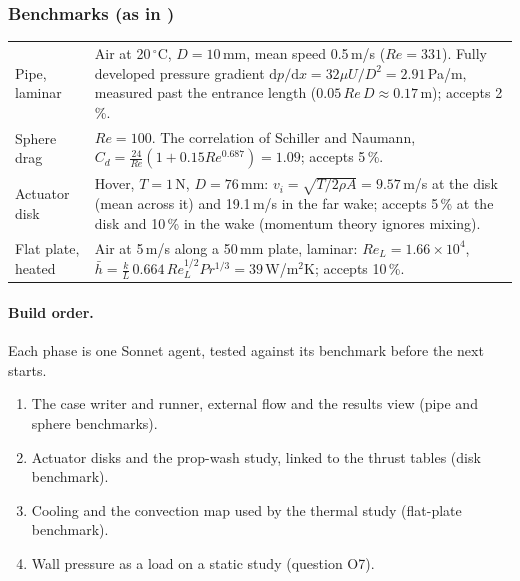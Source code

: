 \subsubsection*{Benchmarks (as in )}
\begin{center}
\small
\begin{tabularx}{\linewidth}{@{}lX@{}}
\toprule
Pipe, laminar & Air at 20\,$^\circ$C, $D=10$\,mm, mean speed 0.5\,m/s ($Re=331$). Fully developed pressure
  gradient $\mathrm dp/\mathrm dx=32\mu U/D^2=2.91$\,Pa/m, measured past the entrance length
  ($0.05\,Re\,D\approx0.17$\,m); accepts 2\,\%.\\
Sphere drag & $Re=100$. The correlation of Schiller and Naumann, $C_d=\frac{24}{Re}(1+0.15Re^{0.687})=1.09$;
  accepts 5\,\%.\\
Actuator disk & Hover, $T=1$\,N, $D=76$\,mm: $v_i=\sqrt{T/2\rho A}=9.57$\,m/s at the disk (mean across it)
  and 19.1\,m/s in the far wake; accepts 5\,\% at the disk and 10\,\% in the wake (momentum theory ignores
  mixing).\\
Flat plate, heated & Air at 5\,m/s along a 50\,mm plate, laminar: $Re_L=1.66\times10^4$,
  $\bar h=\frac{k}{L}\,0.664\,Re_L^{1/2}Pr^{1/3}=39$\,W/m$^2$K; accepts 10\,\%.\\
\bottomrule
\end{tabularx}
\end{center}

\paragraph{Build order.} Each phase is one Sonnet agent, tested against its benchmark before the next starts.
\begin{enumerate}[nosep]
  \item The case writer and runner, external flow and the results view (pipe and sphere benchmarks).
  \item Actuator disks and the prop-wash study, linked to the thrust tables (disk benchmark).
  \item Cooling and the convection map used by the thermal study (flat-plate benchmark).
  \item Wall pressure as a load on a static study (question O7).
\end{enumerate}

